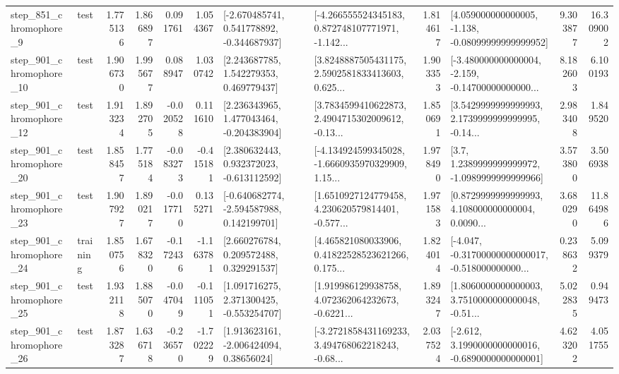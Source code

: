 \begin{tabular}{llrrrrllrlrr}
   step\_851\_chromophore\_9 &      test &      1.775136 &    1.866897 &      0.091761 &  1.054367 &   [-2.670485741, 0.541778892, -0.344687937] &  [-4.266555524345183, 0.872748107771971, -1.142... &       1.814617 &  [4.059000000000005, -1.138, -0.08099999999999952] &            9.303877 &         16.309002 \\
  step\_901\_chromophore\_10 &      test &      1.906730 &    1.995677 &      0.088947 &  1.030742 &     [2.243687785, 1.542279353, 0.469779437] &  [3.8248887505431175, 2.5902581833413603, 0.625... &       1.903353 &  [-3.480000000000004, -2.159, -0.14700000000000... &            8.182603 &          6.100193 \\
  step\_901\_chromophore\_12 &      test &      1.913234 &    1.892705 &     -0.020528 &  0.111610 &    [2.236343965, 1.477043464, -0.204383904] &  [3.7834599410622873, 2.4904715302009612, -0.13... &       1.850691 &  [3.5429999999999993, 2.1739999999999995, -0.14... &            2.983408 &          1.849520 \\
  step\_901\_chromophore\_20 &      test &      1.858457 &    1.775184 &     -0.083273 & -0.415181 &    [2.380632443, 0.932372023, -0.613112592] &  [-4.134924599345028, -1.6660935970329909, 1.15... &       1.978490 &     [3.7, 1.2389999999999972, -1.0989999999999966] &            3.573800 &          3.506938 \\
  step\_901\_chromophore\_23 &      test &      1.907927 &    1.890217 &     -0.017710 &  0.135271 &   [-0.640682774, -2.594587988, 0.142199701] &  [1.6510927124779458, 4.230620579814401, -0.577... &       1.971583 &  [0.8729999999999993, 4.108000000000004, 0.0090... &            3.680290 &         11.864986 \\
  step\_901\_chromophore\_24 &  training &      1.850756 &    1.678320 &     -0.172436 & -1.163781 &     [2.660276784, 0.209572488, 0.329291537] &  [4.465821080033906, 0.41822528523621266, 0.175... &       1.824014 &  [-4.047, -0.31700000000000017, -0.518000000000... &            0.238632 &          5.099379 \\
  step\_901\_chromophore\_25 &      test &      1.932118 &    1.885070 &     -0.047049 & -0.111051 &    [1.091716275, 2.371300425, -0.553254707] &  [1.919986129938758, 4.072362064232673, -0.6221... &       1.893247 &  [1.8060000000000003, 3.7510000000000048, -0.51... &            5.022835 &          0.949473 \\
  step\_901\_chromophore\_26 &      test &      1.873287 &    1.636718 &     -0.236570 & -1.702229 &     [1.913623161, -2.006424094, 0.38656024] &  [-3.2721858431169233, 3.494768062218243, -0.68... &       2.037524 &  [-2.612, 3.1990000000000016, -0.6890000000000001] &            4.623202 &          4.051755 \\

\end{tabular}
